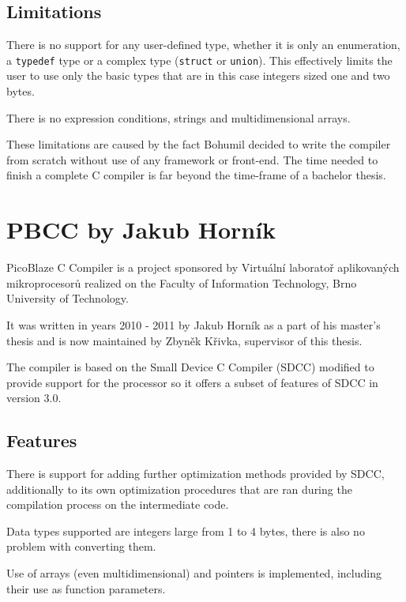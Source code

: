         \subsection{Limitations}

        There is no support for any user-defined type, whether it is only an enumeration, a \texttt{typedef} type or a complex type (\texttt{struct} or \texttt{union}). This effectively limits the user to use only the basic types that are in this case integers sized one and two bytes.

        There is no expression conditions, strings and multidimensional arrays.

        These limitations are caused by the fact Bohumil decided to write the compiler
        from scratch without use of any framework or front-end. The time needed to finish a complete C compiler is far beyond the time-frame of a bachelor thesis.

    \section{PBCC by Jakub Horník}\label{prev_pbcc}

    PicoBlaze C Compiler is a project sponsored by Virtuální laboratoř aplikovaných mikroprocesorů 
    realized on the Faculty of Information Technology, Brno University of Technology.

    It was written in years 2010 - 2011 by Jakub Horník as a part of his master's thesis and is now maintained by Zbyněk Křivka, supervisor of this thesis.\cite{PbccProjekt}

    The compiler is based on the Small Device C Compiler (SDCC) modified to provide support for the processor so it offers a subset of features of SDCC in version 3.0.\cite{PbccHornik}

        \subsection{Features}

        There is support for adding further optimization methods provided by SDCC, additionally to its own optimization procedures 
        that are ran during the compilation process on the intermediate code.

        Data types supported are integers large from 1 to 4 bytes, there is also no problem with converting them.

        Use of arrays (even multidimensional) and pointers is implemented, including their use as function parameters.

